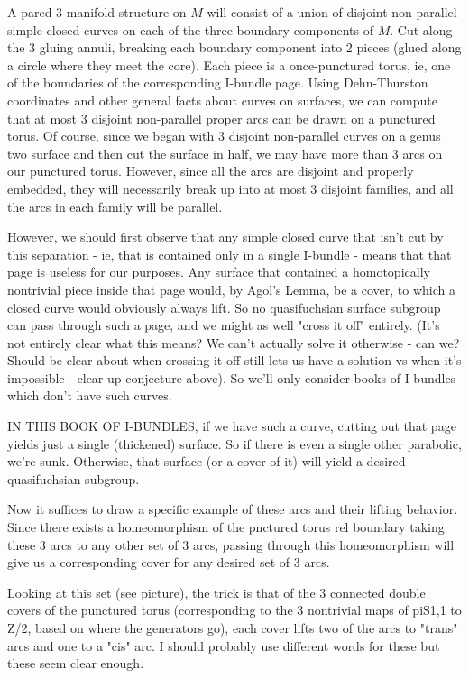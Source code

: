 \documentclass[12pt]{amsart}
\theoremstyle{definition}
\begin{document}
A pared 3-manifold structure on $M$ will consist of a union of disjoint
non-parallel simple closed curves on each of the three boundary components of
$M$. Cut along the 3 gluing annuli, breaking each boundary component into
2 pieces (glued along a circle where they meet the core). Each piece is
a once-punctured torus, ie, one of the boundaries of the corresponding
I-bundle page. Using Dehn-Thurston coordinates and other general facts about
curves on surfaces, we can compute that at most 3 disjoint non-parallel
proper arcs can be drawn on a punctured torus. Of course, since we began with
3 disjoint non-parallel curves on a genus two surface and then cut the
surface in half, we may have more than 3 arcs on our punctured torus.
However, since all the arcs are disjoint and properly embedded, they will
necessarily break up into at most
3 disjoint families, and all the arcs in each family will be parallel.

However, we should first observe that any simple closed curve that isn't cut by
this separation - ie, that is contained only in a single I-bundle - means that
that page is useless for our purposes. Any surface that contained
a homotopically nontrivial piece inside that page would, by Agol's Lemma, be
a cover, to which a closed curve would obviously always lift. So no
quasifuchsian surface subgroup can pass through such a page, and we might as
well "cross it off" entirely. (It's not entirely clear what this means? We
can't actually solve it otherwise - can we? Should be clear about when crossing
it off still lets us have a solution vs when it's impossible - clear up
conjecture above). So we'll only consider books of I-bundles which don't have
such curves.

IN THIS BOOK OF I-BUNDLES, if we have such a curve, cutting out that page
yields just a single (thickened) surface. So if there is even a single other
parabolic, we're sunk. Otherwise, that surface (or a cover of it) will yield
a desired quasifuchsian subgroup.

Now it suffices to draw a specific example of these arcs and their lifting
behavior. Since there exists a homeomorphism of the pnctured torus rel boundary
taking these 3 arcs to any other set of 3 arcs, passing through this
homeomorphism will give us a corresponding cover for any desired set of 3 arcs.

Looking at this set (see picture), the trick is that of the 3 connected double
covers of the punctured torus (corresponding to the 3 nontrivial maps of piS1,1
to Z/2, based on where the generators go), each cover lifts two of the arcs to
"trans" arcs and one to a "cis" arc. I should probably use different words for
these but these seem clear enough.
\end{document}
